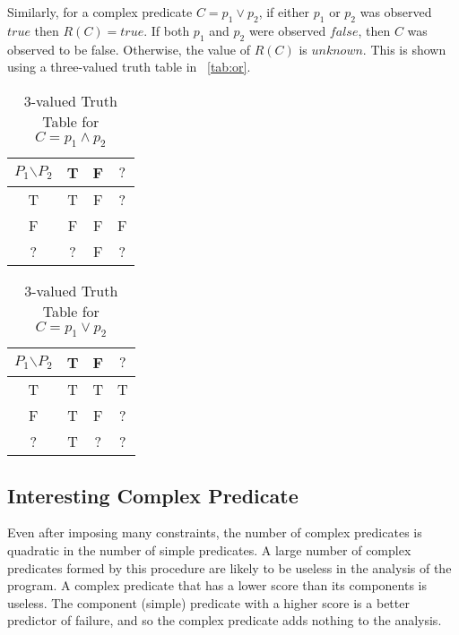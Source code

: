 Similarly, for a complex predicate $C = p_1 \vee p_2$, if either $p_1$ or $p_2$ was observed $true$ then $R(C) = true$.  If both $p_1$ and $p_2$ were observed $false$, then $C$ was observed to be false.  Otherwise, the value of $R(C)$ is $unknown$.  This is shown using a three-valued truth table in ~\autoref{tab:or}.
 
\begin{table*}
\nocaptionrule
\caption{3-valued Truth Table for $C = p_1 \wedge p_2$}
\label{tab:and}
\centering
\scriptsize
  
\begin{tabular}{c|ccc}
  $P_1$$\backslash$$P_2$ & T & F & $?$ \\
  \hline
  T & T & F & ? \\
  F & F & F & F \\
  ? & ? & F & ? \\
\end{tabular}
\end{table*}


\begin{table*}
\nocaptionrule
\caption{3-valued Truth Table for $C = p_1 \vee p_2$}
\label{tab:or}
\centering
\scriptsize
  
  \centering
  \begin{tabular}{c|ccc}
  $P_1$$\backslash$$P_2$ & T & F & $?$ \\
  \hline
  T & T & T & T \\
  F & T & F & ? \\
  ? & T & ? & ? \\
\end{tabular}
\end{table*}

\subsection{Interesting Complex Predicate}

Even after imposing many constraints, the number of complex predicates is quadratic in the number of simple predicates.  A large number of complex predicates formed by this procedure are likely to be useless in the analysis of the program.  A complex predicate that has a lower score than its components is useless.  The component (simple) predicate with a higher score is a better predictor of failure, and so the complex predicate adds nothing to the analysis.

